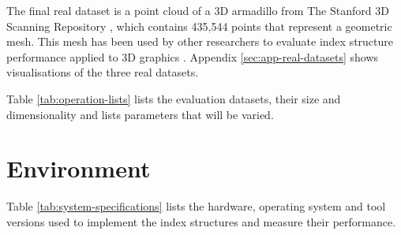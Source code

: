 The final real dataset is a point cloud of a 3D armadillo from The Stanford 3D Scanning Repository \cite{armadillo-mesh}, which contains 435,544 points that represent a geometric mesh. This mesh has been used by other researchers to evaluate index structure performance applied to 3D graphics \cite{kd-tree-gpu, accelerating-kdtree-nn}. Appendix \ref{sec:app-real-datasets} shows visualisations of the three real datasets.

Table \ref{tab:operation-lists} lists the evaluation datasets, their size and dimensionality and lists parameters that will be varied.

\begin{table}
	\centering
	\caption{Evaluation Datasets}
	\label{tab:operation-lists}
\end{table}

\section{Environment}

Table \ref{tab:system-specifications} lists the hardware, operating system and tool versions used to implement the index structures and measure their performance. 

